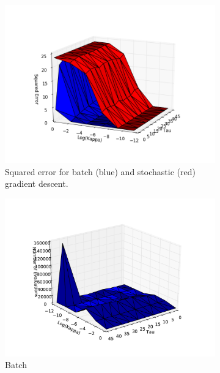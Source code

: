 \documentclass[psamsfonts]{amsart}
\theoremstyle{definition}
\theoremstyle{remark}
\numberwithin{equation}{section}
\begin{document}
\begin{figure}
		\begin{subfigure}[b]{0.8\textwidth}
			\includegraphics[width=\textwidth]{hw1_1-3_acc_both.png}
			\caption{Squared error for batch (blue) and stochastic (red) gradient descent.}
		\end{subfigure}
			\begin{subfigure}[b]{0.48\textwidth}
				\includegraphics[width=\textwidth]{hw1_1-3_timeGD.pdf}
				\caption{Batch}
			\end{subfigure}
		\begin{subfigure}[b]{0.48\textwidth}

\end{subfigure}
\end{figure}
\end{document}
